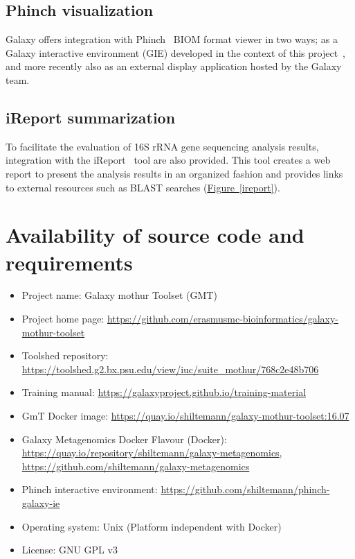 \subsection*{Phinch visualization}
Galaxy offers integration with Phinch~\cite{bik2014phinch} BIOM format viewer in two ways; as a Galaxy interactive environment (GIE) developed in the context of this project~\cite{phinchGIE}, and more recently also as an external display application hosted by the Galaxy team.

\subsection*{iReport summarization}
To facilitate the evaluation of 16S rRNA gene sequencing analysis results, integration with the iReport~\cite{hiltemann2014ireport} tool are also provided. This tool creates a web report to present the analysis results in an organized fashion and provides links to external resources such as BLAST searches (\hyperref[ireport]{Figure~\ref{ireport}}).

\section*{Availability of source code and requirements}

\begin{itemize}
\item Project name: Galaxy mothur Toolset (GMT)
\item Project home page: \url{https://github.com/erasmusmc-bioinformatics/galaxy-mothur-toolset}
\item Toolshed repository: \url{https://toolshed.g2.bx.psu.edu/view/iuc/suite_mothur/768c2e48b706}
\item Training manual: \url{https://galaxyproject.github.io/training-material}
\item GmT Docker image: \url{https://quay.io/shiltemann/galaxy-mothur-toolset:16.07}
\item Galaxy Metagenomics
Docker Flavour (Docker): \url{https://quay.io/repository/shiltemann/galaxy-metagenomics}, \url{https://github.com/shiltemann/galaxy-metagenomics}
\item Phinch interactive environment: \url{https://github.com/shiltemann/phinch-galaxy-ie}
\item Operating system: Unix (Platform independent with Docker)
\item License: GNU GPL v3
\end{itemize}

